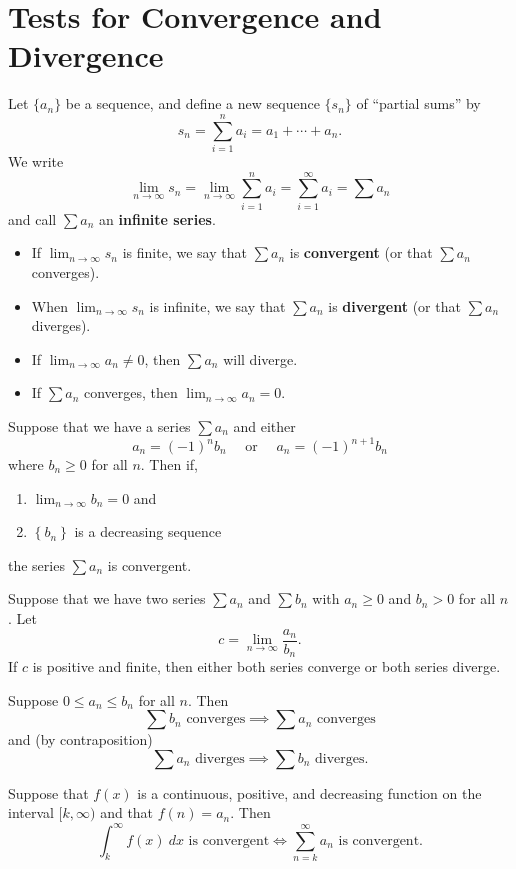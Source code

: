 \section{Tests for Convergence and Divergence}


Let $\{a_n\}$ be a sequence, and define a new sequence $\{s_n\}$ of ``partial sums'' by
$$s_n=\sum_{i=1}^n a_i = a_1 + \cdots + a_n.$$
We write 
$$\lim _{n \to \infty} s_{n}=\lim _{n \to \infty} \sum_{i=1}^{n} a_{i}=\sum_{i=1}^{\infty} a_{i}=\sum a_n$$
and call $\sum a_n$ an \textbf{infinite series}.
\begin{itemize}
    \item If $\displaystyle\lim _{n \to \infty} s_{n}$ is finite, we say that $\sum a_n$ is \textbf{convergent} (or that $\sum a_n$ converges).
    \item  When $\displaystyle\lim _{n \to \infty} s_{n}$ is infinite, we say that $\sum a_n$ is \textbf{divergent} (or that $\sum a_n$ diverges).
\end{itemize}


\begin{thm}
\phantom{}
\begin{itemize}
    \item If $\displaystyle \lim_{n\to\infty}a_n\neq 0$, then $\sum a_n$ will diverge.
    \item If $\sum a_n$ converges, then $\displaystyle \lim_{n\to\infty}a_n=0$.
\end{itemize}
\end{thm}


\begin{thm}
Suppose that we have a series $\sum a_{n}$ and either $$a_{n}=(-1)^{n} b_{n}\quad\text{ or }\quad  a_{n}=(-1)^{n+1} b_{n}$$ where $b_{n} \geq 0$ for all $n .$ Then if,
\begin{enumerate}
    \item $\displaystyle\lim _{n \to \infty} b_{n}=0$ and
    \item $\left\{b_{n}\right\}$ is a decreasing sequence
\end{enumerate}
the series $\sum a_{n}$ is convergent.
\end{thm}

\begin{thm}
Suppose that we have two series $\sum a_n$ and $\sum b_n$ with $a_n\geq 0$ and $b_n > 0$ for all $n$. Let 
$$c=\lim_{n\to\infty}\frac{a_n}{b_n}.$$
If $c$ is positive and finite, then either both series converge or both series diverge.
\end{thm}


\begin{thm}
Suppose $0\leq a_n\leq b_n$ for all $n$. Then
$$\sum b_n\text{ converges}\implies \sum a_n\text{ converges}$$
and (by contraposition)
$$\sum a_n\text{ diverges}\implies \sum b_n\text{ diverges}.$$
\end{thm}


\begin{thm}
Suppose that $f(x)$ is a continuous, positive, and decreasing function on the interval $[k,\infty)$ and that $f(n)=a_n$. Then
$$\int_k^\infty f(x)\ dx\text{ is convergent} \iff \sum_{n=k}^\infty a_n\text{ is convergent}.$$
\end{thm}
